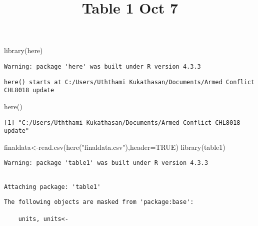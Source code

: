 \documentclass[
  letterpaper,
  DIV=11,
  numbers=noendperiod]{scrartcl}
\title{Table 1 Oct 7}
\author{}
\date{}
\newenvironment{Shaded}{\begin{snugshade}}{\end{snugshade}}
\newcommand{\AttributeTok}[1]{\textcolor[rgb]{0.40,0.45,0.13}{#1}}
\newcommand{\ConstantTok}[1]{\textcolor[rgb]{0.56,0.35,0.01}{#1}}
\newcommand{\FunctionTok}[1]{\textcolor[rgb]{0.28,0.35,0.67}{#1}}
\newcommand{\NormalTok}[1]{\textcolor[rgb]{0.00,0.23,0.31}{#1}}
\newcommand{\OtherTok}[1]{\textcolor[rgb]{0.00,0.23,0.31}{#1}}
\newcommand{\StringTok}[1]{\textcolor[rgb]{0.13,0.47,0.30}{#1}}
\begin{document}
\maketitle


\begin{Shaded}
\begin{Highlighting}[]
\FunctionTok{library}\NormalTok{(here)}
\end{Highlighting}
\end{Shaded}

\begin{verbatim}
Warning: package 'here' was built under R version 4.3.3
\end{verbatim}

\begin{verbatim}
here() starts at C:/Users/Uththami Kukathasan/Documents/Armed Conflict CHL8018 update
\end{verbatim}

\begin{Shaded}
\begin{Highlighting}[]
\FunctionTok{here}\NormalTok{()}
\end{Highlighting}
\end{Shaded}

\begin{verbatim}
[1] "C:/Users/Uththami Kukathasan/Documents/Armed Conflict CHL8018 update"
\end{verbatim}

\begin{Shaded}
\begin{Highlighting}[]
\NormalTok{finaldata}\OtherTok{\textless{}{-}}\FunctionTok{read.csv}\NormalTok{(}\FunctionTok{here}\NormalTok{(}\StringTok{"finaldata.csv"}\NormalTok{),}\AttributeTok{header=}\ConstantTok{TRUE}\NormalTok{)}
\FunctionTok{library}\NormalTok{(table1)}
\end{Highlighting}
\end{Shaded}

\begin{verbatim}
Warning: package 'table1' was built under R version 4.3.3
\end{verbatim}

\begin{verbatim}

Attaching package: 'table1'
\end{verbatim}

\begin{verbatim}
The following objects are masked from 'package:base':

    units, units<-
\end{verbatim}
\end{document}
